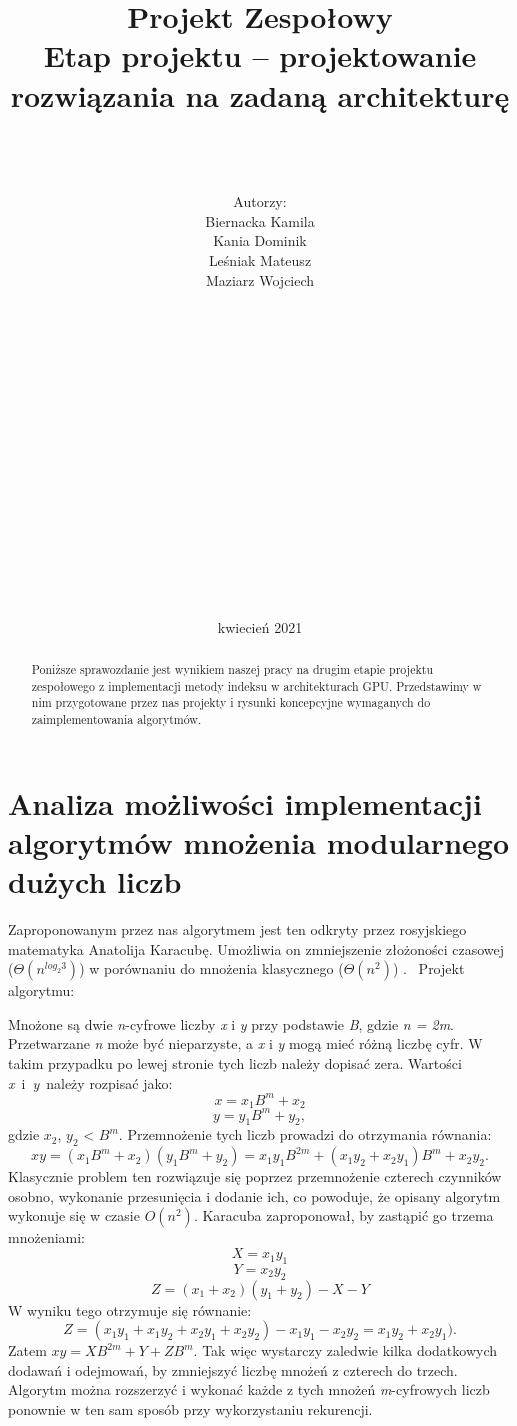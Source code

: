 \documentclass[]{article}
\title{Projekt Zespołowy \\
	\Huge Etap projektu – projektowanie rozwiązania na zadaną architekturę}
\author{\\ \\ \\ Autorzy:
	\\Biernacka Kamila\\ 
	Kania Dominik\\ 
	Leśniak Mateusz\\ 
	Maziarz Wojciech\\ \\ \\ \\ \\ \\ \\ \\ \\ \\ \\ \\ \\ \\ \\ \\ \\  }
\date{kwiecień 2021}
\begin{document}
\maketitle
\newpage

\begin{abstract}

Poniższe sprawozdanie jest wynikiem naszej pracy na drugim etapie projektu zespołowego z implementacji metody indeksu w architekturach GPU. Przedstawimy w nim przygotowane przez nas projekty i rysunki koncepcyjne wymaganych do zaimplementowania algorytmów.



\end{abstract}

\section{Analiza możliwości implementacji algorytmów mnożenia modularnego dużych liczb}
Zaproponowanym przez nas algorytmem jest ten odkryty przez rosyjskiego matematyka Anatolija Karacubę. Umożliwia on zmniejszenie złożoności czasowej ($\Theta(n^{log_{2}3})$) w porównaniu do mnożenia klasycznego ($\Theta(n^2)$) .
\newline\newline
~Projekt algorytmu:\newline

Mnożone są dwie \textit{n}-cyfrowe liczby \textit{x} i \textit{y} przy podstawie \textit{B}, gdzie \textit{n = 2m}. Przetwarzane \textit{n} może być nieparzyste, a \textit{x} i \textit{y} mogą mieć różną liczbę cyfr. W takim przypadku po lewej stronie tych liczb należy dopisać zera. Wartości \textit{x}~i~\textit{y}~należy rozpisać jako:\newline
$$ x = x_{1}B^{m} + x_2 $$
$$ y = y_{1}B^{m} + y_2, $$
gdzie $x_2$, $y_2$ < $B^m$. \newline
Przemnożenie tych liczb prowadzi do otrzymania równania:
$$xy = (x_{1}B^{m} + x_2)(y_1B^m + y_2) = x_1y_1B^{2m} + (x_1y_2 + x_2y_1)B^m + x_2y_2.$$ 
Klasycznie problem ten rozwiązuje się poprzez przemnożenie czterech czynników osobno, wykonanie przesunięcia i dodanie ich, co powoduje, że opisany algorytm wykonuje się w czasie $\textit{O}(n^{2})$. Karacuba zaproponował, by zastąpić go trzema mnożeniami:
$$X = x_1y_1$$
$$Y = x_2y_2$$
$$Z = (x_1 + x_2)(y_1 + y_2) - X - Y$$
W wyniku tego otrzymuje się równanie:
$$ Z = (x_1y_1 + x_1y_2 + x_2y_1 + x_2y_2) - x_1y_1 - x_2y_2 = x_1y_2 + x_2y_1).$$
Zatem $xy = XB^{2m} + Y + ZB^m$. Tak więc wystarczy zaledwie kilka dodatkowych dodawań i odejmowań, by zmniejszyć liczbę mnożeń z czterech do trzech.\newline
Algorytm można rozszerzyć i wykonać każde z tych mnożeń \textit{m}-cyfrowych liczb ponownie w ten sam sposób przy wykorzystaniu rekurencji.
\end{document}
